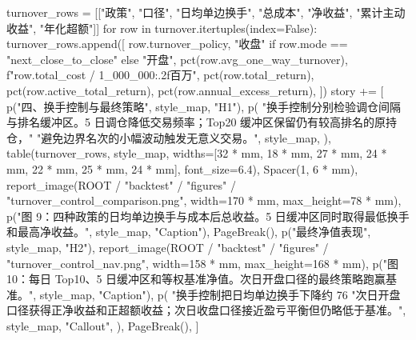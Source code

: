 \documentclass[UTF8,a4paper,fontset=fandol]{ctexart}
\begin{document}
\begin{ProjectCode}
{    turnover_rows = [["政策", "口径", "日均单边换手", "总成本", "净收益", "累计主动收益", "年化超额"]]
    for row in turnover.itertuples(index=False):
        turnover_rows.append([
            row.turnover_policy,
            "收盘" if row.mode == "next_close_to_close" else "开盘",
            pct(row.avg_one_way_turnover),
            f"{row.total_cost / 1_000_000:.2f}百万",
            pct(row.total_return),
            pct(row.active_total_return),
            pct(row.annual_excess_return),
        ])
    story += [
        p("四、换手控制与最终策略", style_map, "H1"),
        p(
            "换手控制分别检验调仓间隔与排名缓冲区。5 日调仓降低交易频率；Top20 缓冲区保留仍有较高排名的原持仓，"
            "避免边界名次的小幅波动触发无意义交易。",
            style_map,
        ),
        table(turnover_rows, style_map, widths=[32 * mm, 18 * mm, 27 * mm, 24 * mm, 22 * mm, 25 * mm, 24 * mm], font_size=6.4),
        Spacer(1, 6 * mm),
        report_image(ROOT / "backtest" / "figures" / "turnover_control_comparison.png", width=170 * mm, max_height=78 * mm),
        p("图 9：四种政策的日均单边换手与成本后总收益。5 日缓冲区同时取得最低换手和最高净收益。", style_map, "Caption"),
        PageBreak(),
        p("最终净值表现", style_map, "H2"),
        report_image(ROOT / "backtest" / "figures" / "turnover_control_nav.png", width=158 * mm, max_height=168 * mm),
        p("图 10：每日 Top10、5 日缓冲区和等权基准净值。次日开盘口径的最终策略跑赢基准。", style_map, "Caption"),
        p(
            "换手控制把日均单边换手下降约 76%
            "次日开盘口径获得正净收益和正超额收益；次日收盘口径接近盈亏平衡但仍略低于基准。",
            style_map,
            "Callout",
        ),
        PageBreak(),
    ]

}
\end{ProjectCode}
\end{document}
